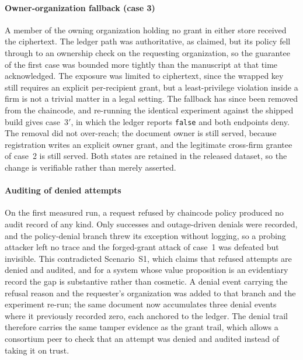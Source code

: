 \documentclass[preprint,12pt]{elsarticle}
\begin{document}
\paragraph{Owner-organization fallback (case 3)}
A member of the owning organization holding no grant in either store received
the ciphertext. The ledger path was authoritative, as claimed, but its policy
fell through to an ownership check on the requesting organization, so the
guarantee of the first case was bounded more tightly than the manuscript at
that time acknowledged. The exposure was limited to ciphertext, since the
wrapped key still requires an explicit per-recipient grant, but a
least-privilege violation inside a firm is not a trivial matter in a legal
setting. The fallback has since been removed from the chaincode, and re-running
the identical experiment against the shipped build gives case~3$'$, in which
the ledger reports \texttt{false} and both endpoints deny. The removal did not
over-reach; the document owner is still served, because registration writes an
explicit owner grant, and the legitimate cross-firm grantee of case~2 is still
served. Both states are retained in the released dataset, so the change is
verifiable rather than merely asserted.

\paragraph{Auditing of denied attempts}
On the first measured run, a request refused by chaincode policy produced no
audit record of any kind. Only successes and outage-driven denials were
recorded, and the policy-denial branch threw its exception without logging, so
a probing attacker left no trace and the forged-grant attack of case~1 was
defeated but invisible. This contradicted Scenario~S1, which claims that
refused attempts are denied and audited, and for a system whose value
proposition is an evidentiary record the gap is substantive rather than
cosmetic. A denial event carrying the refusal reason and the requester's
organization was added to that branch and the experiment re-run; the same
document now accumulates three denial events where it previously recorded
zero, each anchored to the ledger. The denial trail therefore carries the same
tamper evidence as the grant trail, which allows a consortium peer to check
that an attempt was denied and audited instead of taking it on trust.
\end{document}
